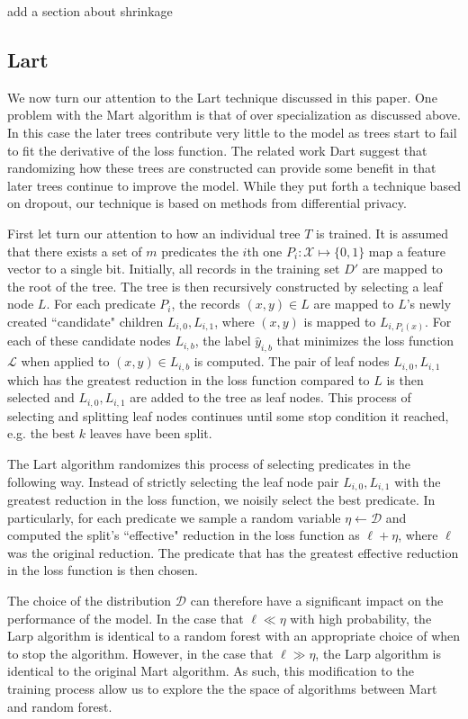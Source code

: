 \documentclass{article} %
\begin{document}
{\color{red} add a section about shrinkage}


\subsection{Lart}
We now turn our attention to the Lart technique discussed in this paper. One problem with the Mart algorithm is that of over specialization as discussed above\cite{dart}. In this case the later trees contribute very little to the  model as trees start to fail to fit the derivative of the loss function. The related work Dart \cite{dart} suggest that randomizing how these trees are constructed can provide some benefit in that later trees continue to improve the model. While they put forth a technique based on dropout, our technique is based on methods from differential privacy.


First let turn our attention to how an individual tree $T$ is trained. It is assumed that there exists a set of $m$ predicates the $i$th one $P_i:\mathcal{X} \mapsto \{0,1\}$ map a feature vector to a single bit.  Initially, all records in the training set $D'$ are mapped to the root of the tree. The tree is then recursively constructed by selecting a leaf node $L$. For each predicate $P_i$, the records $(x,y)\in L$ are mapped to $L$'s newly created ``candidate" children $L_{i,0},L_{i,1}$, where $(x,y)$ is mapped to $L_{i,P_i(x)}$. For each of these candidate nodes $L_{i,b}$, the label $\hat{y}_{i,b}$ that minimizes the loss function $\mathcal{L}$ when applied to $(x,y)\in L_{i,b}$ is computed. The pair of leaf nodes $L_{i,0}, L_{i,1}$ which has the greatest reduction in the loss function compared to $L$ is then selected and $L_{i,0}, L_{i,1}$ are added to the tree as leaf nodes. This process of selecting and splitting leaf nodes continues until some stop condition it reached, e.g. the best $k$ leaves have been split.

The Lart algorithm randomizes this process of selecting predicates in the following way. Instead of strictly selecting the leaf node pair $L_{i,0}, L_{i,1}$ with the greatest reduction in the loss function, we noisily select the best predicate. In particularly, for each predicate we sample a random variable $\eta\gets \mathcal{D}$ and computed the split's ``effective" reduction in the loss function as $\ell + \eta$, where $\ell$ was the original reduction. The predicate that has the greatest effective reduction in the loss function is then chosen.

The choice of the distribution $\mathcal{D}$ can therefore have a significant impact on the performance of the model. In the case that $\ell \ll \eta$ with high probability,  the Larp algorithm is identical to a random forest with an appropriate choice of when to stop the algorithm. However, in the case that $\ell \gg \eta$, the Larp algorithm is identical to the original Mart algorithm. As such, this modification to the training process allow us to explore the the space of algorithms between Mart and random forest.
\end{document}
